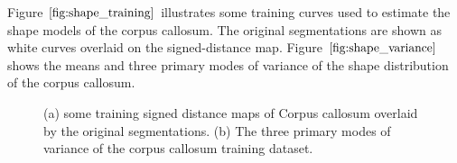 \documentclass{SMBV13}
\begin{document}
Figure $\ref{fig:shape_training}$ illustrates some training curves used to estimate the shape models of the corpus callosum. The original segmentations are shown as white curves overlaid on the signed-distance map. Figure $\ref{fig:shape_variance}$ shows the means and three primary modes of variance of the shape distribution of the corpus callosum.

\begin{figure}[htbp]
    \centering
    \caption{(a) some training signed distance maps of Corpus callosum overlaid by the original segmentations. (b) The three primary modes of variance of the corpus callosum training dataset.}
\end{figure}
\end{document}
